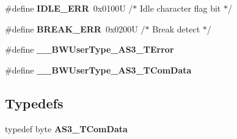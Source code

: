 \begin{DoxyCompactItemize}
\item 
\#define {\bfseries I\+D\+L\+E\+\_\+\+E\+RR}~0x0100\+U       /$\ast$ Idle character flag bit   $\ast$/\hypertarget{group___a_s3__module_ga4584e89e739c19496724ba117e62aed9}{}\label{group___a_s3__module_ga4584e89e739c19496724ba117e62aed9}

\item 
\#define {\bfseries B\+R\+E\+A\+K\+\_\+\+E\+RR}~0x0200\+U       /$\ast$ Break detect              $\ast$/\hypertarget{group___a_s3__module_ga0cb4d61ee3347eb62142ca0eb1d02a53}{}\label{group___a_s3__module_ga0cb4d61ee3347eb62142ca0eb1d02a53}

\item 
\#define {\bfseries \+\_\+\+\_\+\+B\+W\+User\+Type\+\_\+\+A\+S3\+\_\+\+T\+Error}\hypertarget{group___a_s3__module_ga36f237fcfb2de4435eb34923e97d88d9}{}\label{group___a_s3__module_ga36f237fcfb2de4435eb34923e97d88d9}

\item 
\#define {\bfseries \+\_\+\+\_\+\+B\+W\+User\+Type\+\_\+\+A\+S3\+\_\+\+T\+Com\+Data}\hypertarget{group___a_s3__module_gaa984f50ec077577df068ba15ae3f3d16}{}\label{group___a_s3__module_gaa984f50ec077577df068ba15ae3f3d16}

\end{DoxyCompactItemize}
\subsection*{Typedefs}
\begin{DoxyCompactItemize}
\item 
typedef byte {\bfseries A\+S3\+\_\+\+T\+Com\+Data}\hypertarget{group___a_s3__module_ga20c2e78cbd0c231bcc80056362c0d398}{}\label{group___a_s3__module_ga20c2e78cbd0c231bcc80056362c0d398}

\end{DoxyCompactItemize}
